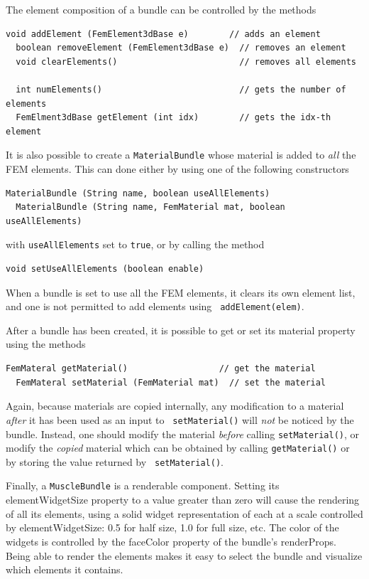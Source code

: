 The element composition of a bundle can be controlled by the methods
%
\begin{lstlisting}[]
  void addElement (FemElement3dBase e)        // adds an element
  boolean removeElement (FemElement3dBase e)  // removes an element
  void clearElements()                        // removes all elements

  int numElements()                           // gets the number of elements
  FemElment3dBase getElement (int idx)        // gets the idx-th element 
\end{lstlisting}
%

It is also possible to create a {\tt MaterialBundle} whose material is
added to {\it all} the FEM elements. This can done either by using one
of the following constructors
%
\begin{lstlisting}[]
  MaterialBundle (String name, boolean useAllElements)
  MaterialBundle (String name, FemMaterial mat, boolean useAllElements)
\end{lstlisting}
%
with {\tt useAllElements} set to {\tt true}, or
by calling the method
%
\begin{lstlisting}[]
  void setUseAllElements (boolean enable)
\end{lstlisting}
%
When a bundle is set to use all the FEM elements, it clears its own
element list, and one is not permitted to add elements using {\tt
addElement(elem)}.

After a bundle has been created, it is possible to get or set
its {\sf material} property using the methods
%
\begin{lstlisting}[]
  FemMateral getMaterial()                  // get the material
  FemMateral setMaterial (FemMaterial mat)  // set the material
\end{lstlisting}
%
Again, because materials are copied internally, any modification to a
material {\it after} it has been used as an input to {\tt
setMaterial()} will {\it not} be noticed by the bundle. Instead, one
should modify the material {\it before} calling {\tt setMaterial()},
or modify the {\it copied} material which can be obtained by calling
{\tt getMaterial()} or by storing the value returned by {\tt
setMaterial()}.

Finally, a {\tt MuscleBundle} is a renderable component. Setting its
{\sf elementWidgetSize} property to a value greater than zero will
cause the rendering of all its elements, using a solid widget
representation of each at a scale controlled by {\sf elementWidgetSize}:
0.5 for half size, 1.0 for full size, etc. The color of the
widgets is controlled by the {\sf faceColor} property of the bundle's
{\sf renderProps}. Being able to render the elements makes it easy to
select the bundle and visualize which elements it contains.

